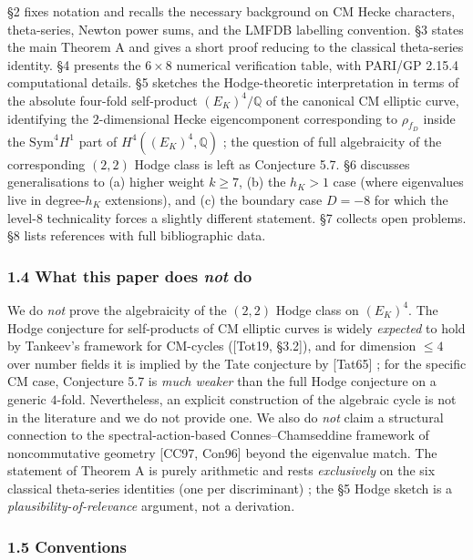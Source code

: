\documentclass[
  11pt,
  a4paper,
]{amsart}
\begin{document}
§2 fixes notation and recalls the necessary background on CM Hecke characters, theta-series, Newton power sums, and the LMFDB labelling convention. §3 states the main Theorem A and gives a short proof reducing to the classical theta-series identity. §4 presents the \(6 \times 8\) numerical verification table, with PARI/GP 2.15.4 computational details. §5 sketches the Hodge-theoretic interpretation in terms of the absolute four-fold self-product \((E_K)^4 / \mathbb{Q}\) of the canonical CM elliptic curve, identifying the \(2\)-dimensional Hecke eigencomponent corresponding to \(\rho_{f_D}\) inside the \(\mathrm{Sym}^4 H^1\) part of \(H^4((E_K)^4, \mathbb{Q})\) ; the question of full algebraicity of the corresponding \((2, 2)\) Hodge class is left as Conjecture 5.7. §6 discusses generalisations to (a) higher weight \(k \geq 7\), (b) the \(h_K > 1\) case (where eigenvalues live in degree-\(h_K\) extensions), and (c) the boundary case \(D = -8\) for which the level-\(8\) technicality forces a slightly different statement. §7 collects open problems. §8 lists references with full bibliographic data.

\hypertarget{what-this-paper-does-not-do}{%
\subsubsection{\texorpdfstring{1.4 What this paper does \emph{not} do}{1.4 What this paper does not do}}\label{what-this-paper-does-not-do}}

We do \emph{not} prove the algebraicity of the \((2, 2)\) Hodge class on \((E_K)^4\). The Hodge conjecture for self-products of CM elliptic curves is widely \emph{expected} to hold by Tankeev's framework for CM-cycles ({[}Tot19, §3.2{]}), and for dimension \(\leq 4\) over number fields it is implied by the Tate conjecture by {[}Tat65{]} ; for the specific CM case, Conjecture 5.7 is \emph{much weaker} than the full Hodge conjecture on a generic \(4\)-fold. Nevertheless, an explicit construction of the algebraic cycle is not in the literature and we do not provide one. We also do \emph{not} claim a structural connection to the spectral-action-based Connes--Chamseddine framework of noncommutative geometry {[}CC97, Con96{]} beyond the eigenvalue match. The statement of Theorem A is purely arithmetic and rests \emph{exclusively} on the six classical theta-series identities (one per discriminant) ; the §5 Hodge sketch is a \emph{plausibility-of-relevance} argument, not a derivation.

\hypertarget{conventions}{%
\subsubsection{1.5 Conventions}\label{conventions}}
\end{document}
